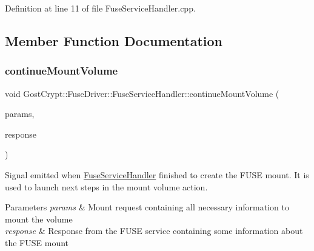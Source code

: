 Definition at line 11 of file Fuse\+Service\+Handler.\+cpp.



\subsection{Member Function Documentation}
\mbox{\label{class_gost_crypt_1_1_fuse_driver_1_1_fuse_service_handler_a8d56ee0d6dfa8b61b0a554ab4d1dd60b}} 
\subsubsection{\texorpdfstring{continue\+Mount\+Volume}{continueMountVolume}}
{\footnotesize\ttfamily void Gost\+Crypt\+::\+Fuse\+Driver\+::\+Fuse\+Service\+Handler\+::continue\+Mount\+Volume (\begin{DoxyParamCaption}\item[{Q\+Shared\+Pointer$<$ \hyperlink{struct_gost_crypt_1_1_core_1_1_mount_volume_request}{Core\+::\+Mount\+Volume\+Request} $>$}]{params,  }\item[{Q\+Shared\+Pointer$<$ \hyperlink{struct_gost_crypt_1_1_core_1_1_mount_volume_response}{Core\+::\+Mount\+Volume\+Response} $>$}]{response }\end{DoxyParamCaption})\hspace{0.3cm}{\ttfamily [signal]}}



Signal emitted when \hyperlink{class_gost_crypt_1_1_fuse_driver_1_1_fuse_service_handler}{Fuse\+Service\+Handler} finished to create the F\+U\+SE mount. It is used to launch next steps in the mount volume action. 


\begin{DoxyParams}{Parameters}
{\em params} & Mount request containing all necessary information to mount the volume \\
\hline
{\em response} & Response from the F\+U\+SE service containing some information about the F\+U\+SE mount \\
\hline
\end{DoxyParams}
\mbox{\label{class_gost_crypt_1_1_fuse_driver_1_1_fuse_service_handler_a6a96ca8fdbbcd35dab5572dde85a764c}} 
